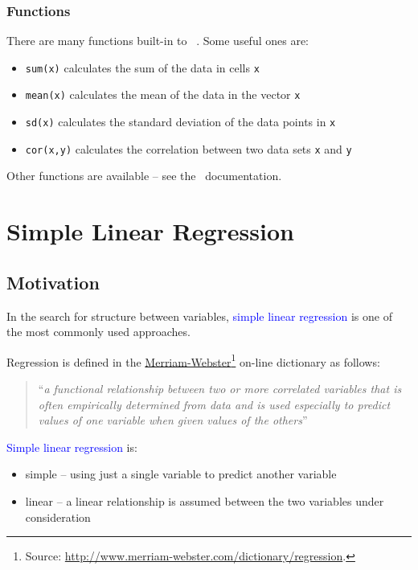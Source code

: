 \documentclass[12pt,a4paper,openany,twoside]{report}
\newcommand{\blue}{\textcolor{blue}}
\newcommand{\emphx}[1]{\blue{#1}}
\theoremstyle{definition}
\theoremstyle{remark}
\theoremstyle{plain}
\newcommand{\sR}[1]{\textbf{R}\,}
\theoremstyle{definition}
\theoremstyle{definition}
\theoremstyle{definition}
\theoremstyle{remark}
\begin{document}
\hypertarget{functions}{%
\subsection{Functions}\label{functions}}

There are many functions built-in to \sR~. Some useful ones are:

\begin{itemize}
\item
  \texttt{sum(x)} calculates the sum of the data in cells \texttt{x}
\item
  \texttt{mean(x)} calculates the mean of the data in the vector \texttt{x}
\item
  \texttt{sd(x)} calculates the standard deviation of the data points in \texttt{x}
\item
  \texttt{cor(x,y)} calculates the correlation between two data sets \texttt{x} and \texttt{y}
\end{itemize}

Other functions are available -- see the \sR~documentation.

\hypertarget{slr}{%
\chapter{Simple Linear Regression}\label{slr}}

\hypertarget{slrmotivation}{%
\section{Motivation}\label{slrmotivation}}

In the search for structure between variables, \emphx{simple linear regression} is one of the most commonly used approaches.

Regression is defined in the \href{http://www.merriam-webster.com/dictionary/regression}{Merriam-Webster}\footnote{Source: \url{http://www.merriam-webster.com/dictionary/regression}.}
on-line dictionary as
follows:

\begin{quote}
``\textit{a functional relationship between two or more correlated variables that is often empirically determined from data and is used especially to predict values of one variable when 
given values of the others}''
\end{quote}

\emphx{Simple linear regression} is:

\begin{itemize}
\item
  simple -- using just a single variable to predict another variable
\item
  linear -- a linear relationship is assumed between the two variables under consideration
\end{itemize}
\end{document}
